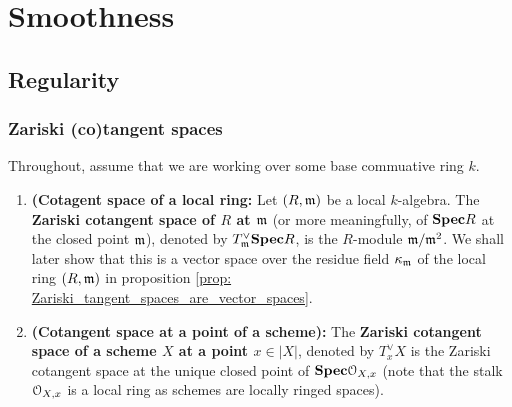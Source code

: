 \chapter{Smoothness} \label{chapter: smoothness}
    \begin{abstract}
        
    \end{abstract}
    
    \minitoc
    
    \section{Regularity}
        \subsection{Zariski (co)tangent spaces}
            \begin{definition} \label{def: zariski_tangent_spaces} 
                Throughout, assume that we are working over some base commuative ring $k$. 
                \begin{enumerate}
                    \item \textbf{(Cotagent space of a local ring:} Let $(R, \mathfrak{m})$ be a local $k$-algebra. The \textbf{Zariski cotangent space of $R$ at $\mathfrak{m}$} (or more meaningfully, of $\mathbf{Spec} R$ at the closed point $\mathfrak{m}$), denoted by $T^{\vee}_{\mathfrak{m}}\mathbf{Spec} R$, is the $R$-module $\mathfrak{m}/\mathfrak{m}^2$. We shall later show that this is a vector space over the residue field $\kappa_{\mathfrak{m}}$ of the local ring $(R, \mathfrak{m})$ in proposition \ref{prop: Zariski_tangent_spaces_are_vector_spaces}.   
                    \item \textbf{(Cotangent space at a point of a scheme):} The \textbf{Zariski cotangent space of a scheme $X$ at a point $x \in |X|$}, denoted by $T^{\vee}_xX$ is the Zariski cotangent space at the unique closed point of $\mathbf{Spec} \mathcal{O}_{X, x}$ (note that the stalk $\mathcal{O}_{X, x}$ is a local ring as schemes are locally ringed spaces).
                \end{enumerate}
            \end{definition}
